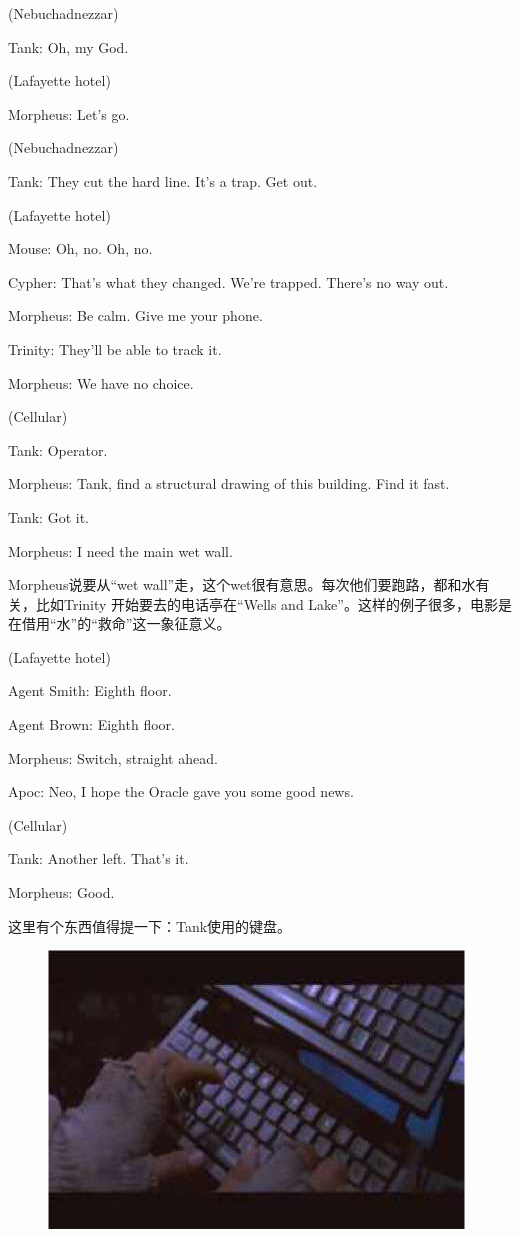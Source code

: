 \documentclass[UTF8]{ctexart}
\newenvironment{myquote}{\color{green} \setlength{\leftskip}{6em} \setlength{\rightskip}{4em} \setlength{\parindent}{-2em}}{\par}
\begin{document}
\begin{myquote}
(Nebuchadnezzar)

Tank: Oh, my God.

(Lafayette hotel)

Morpheus: Let's go.

(Nebuchadnezzar)

Tank: They cut the hard line. It's a trap. Get out.

(Lafayette hotel)

Mouse: Oh, no. Oh, no.

Cypher: That's what they changed. We're trapped. There's no way out.

Morpheus: Be calm. Give me your phone.

Trinity: They'll be able to track it.

Morpheus: We have no choice.

(Cellular)

Tank: Operator.

Morpheus: Tank, find a structural drawing of this building. Find it fast.

Tank: Got it.

Morpheus: I need the main wet wall.
\end{myquote}

Morpheus说要从“wet wall”走，这个wet很有意思。每次他们要跑路，都和水有关，比如Trinity 开始要去的电话亭在“Wells and Lake”。这样的例子很多，电影是在借用“水”的“救命”这一象征意义。

\begin{myquote}
(Lafayette hotel)

Agent Smith: Eighth floor.

Agent Brown: Eighth floor.

Morpheus: Switch, straight ahead.

Apoc: Neo, I hope the Oracle gave you some good news.

(Cellular)

Tank: Another left. That's it.

Morpheus: Good.
\end{myquote}

这里有个东西值得提一下：Tank使用的键盘。

\begin{figure}[htb]
\centering
\includegraphics[width=0.5\linewidth]{fig/read_Matrix-55}
\end{figure}
\end{document}
